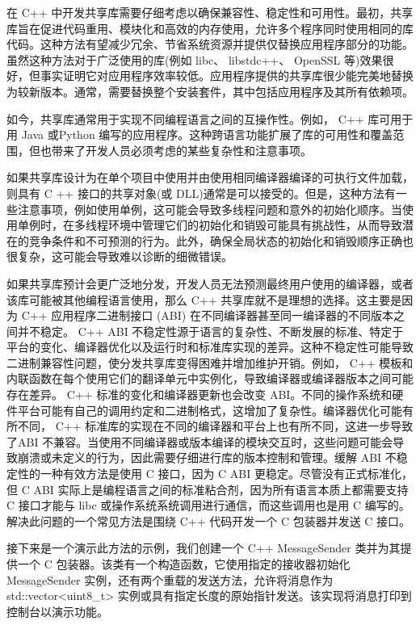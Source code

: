 
在 C++ 中开发共享库需要仔细考虑以确保兼容性、稳定性和可用性。最初，共享库旨在促进代码重用、模块化和高效的内存使用，允许多个程序同时使用相同的库代码。这种方法有望减少冗余、节省系统资源并提供仅替换应用程序部分的功能。虽然这种方法对于广泛使用的库(例如 libc、 libstdc++、 OpenSSL 等)效果很好，但事实证明它对应用程序效率较低。应用程序提供的共享库很少能完美地替换为较新版本。通常，需要替换整个安装套件，其中包括应用程序及其所有依赖项。

如今，共享库通常用于实现不同编程语言之间的互操作性。例如， C++ 库可用于用 Java 或Python 编写的应用程序。这种跨语言功能扩展了库的可用性和覆盖范围，但也带来了开发人员必须考虑的某些复杂性和注意事项。


如果共享库设计为在单个项目中使用并由使用相同编译器编译的可执行文件加载，则具有 C ++ 接口的共享对象(或 DLL)通常是可以接受的。但是，这种方法有一些注意事项，例如使用单例，这可能会导致多线程问题和意外的初始化顺序。当使用单例时，在多线程环境中管理它们的初始化和销毁可能具有挑战性，从而导致潜在的竞争条件和不可预测的行为。此外，确保全局状态的初始化和销毁顺序正确也很复杂，这可能会导致难以诊断的细微错误。


如果共享库预计会更广泛地分发，开发人员无法预测最终用户使用的编译器，或者该库可能被其他编程语言使用，那么 C++ 共享库就不是理想的选择。这主要是因为 C++ 应用程序二进制接口 (ABI) 在不同编译器甚至同一编译器的不同版本之间并不稳定。 C++ ABI 不稳定性源于语言的复杂性、不断发展的标准、特定于平台的变化、编译器优化以及运行时和标准库实现的差异。这种不稳定性可能导致二进制兼容性问题，使分发共享库变得困难并增加维护开销。例如， C++ 模板和内联函数在每个使用它们的翻译单元中实例化，导致编译器或编译器版本之间可能存在差异。 C++ 标准的变化和编译器更新也会改变 ABI。不同的操作系统和硬件平台可能有自己的调用约定和二进制格式，这增加了复杂性。编译器优化可能有所不同， C++ 标准库的实现在不同的编译器和平台上也有所不同，这进一步导致了ABI 不兼容。当使用不同编译器或版本编译的模块交互时，这些问题可能会导致崩溃或未定义的行为，因此需要仔细进行库的版本控制和管理。缓解 ABI 不稳定性的一种有效方法是使用 C 接口，因为 C ABI 更稳定。尽管没有正式标准化，但 C ABI 实际上是编程语言之间的标准粘合剂，因为所有语言本质上都需要支持 C 接口才能与 libc 或操作系统系统调用进行通信，而这些调用也是用 C 编写的。解决此问题的一个常见方法是围绕 C++ 代码开发一个 C 包装器并发送 C 接口。


接下来是一个演示此方法的示例，我们创建一个 C++ MessageSender 类并为其提供一个 C 包装器。该类有一个构造函数，它使用指定的接收器初始化 MessageSender 实例，还有两个重载的发送方法，允许将消息作为 std::vector<uint8\_t> 实例或具有指定长度的原始指针发送。该实现将消息打印到控制台以演示功能。

